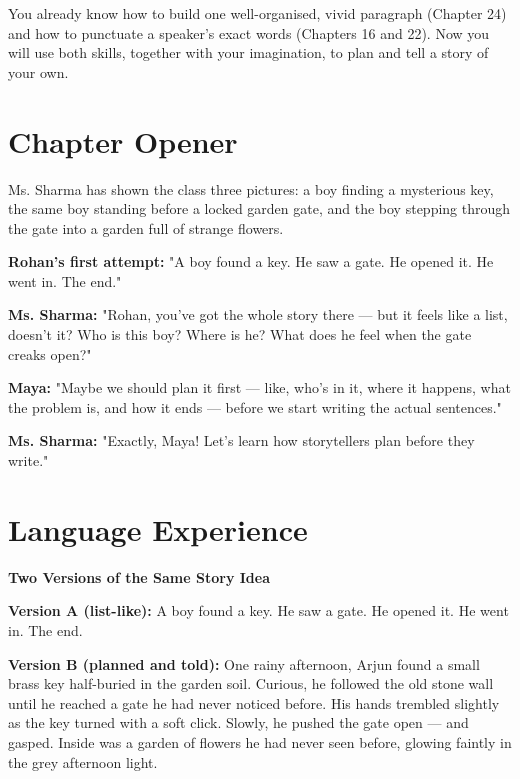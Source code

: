 \begin{rememberbox}
You already know how to build one well-organised, vivid paragraph (Chapter 24) and how to punctuate a speaker's exact words (Chapters 16 and 22). Now you will use both skills, together with your imagination, to plan and tell a story of your own.
\end{rememberbox}

\section{Chapter Opener}
Ms. Sharma has shown the class three pictures: a boy finding a mysterious key, the same boy standing before a locked garden gate, and the boy stepping through the gate into a garden full of strange flowers.

\textbf{Rohan's first attempt:} "A boy found a key. He saw a gate. He opened it. He went in. The end."

\textbf{Ms. Sharma:} "Rohan, you've got the whole story there — but it feels like a list, doesn't it? Who is this boy? Where is he? What does he feel when the gate creaks open?"

\textbf{Maya:} "Maybe we should plan it first — like, who's in it, where it happens, what the problem is, and how it ends — before we start writing the actual sentences."

\textbf{Ms. Sharma:} "Exactly, Maya! Let's learn how storytellers plan before they write."

\section{Language Experience}
\textbf{Two Versions of the Same Story Idea}

\begin{tcolorbox}[colback=gray!5, colframe=gray!50, sharp corners, boxsep=0pt, left=5pt, right=5pt, top=5pt, bottom=5pt, breakable]
\textbf{Version A (list-like):} A boy found a key. He saw a gate. He opened it. He went in. The end.
\end{tcolorbox}

\begin{tcolorbox}[colback=gray!5, colframe=gray!50, sharp corners, boxsep=0pt, left=5pt, right=5pt, top=5pt, bottom=5pt, breakable]
\textbf{Version B (planned and told):} One rainy afternoon, Arjun found a small brass key half-buried in the garden soil. Curious, he followed the old stone wall until he reached a gate he had never noticed before. His hands trembled slightly as the key turned with a soft click. Slowly, he pushed the gate open --- and gasped. Inside was a garden of flowers he had never seen before, glowing faintly in the grey afternoon light.
\end{tcolorbox}

